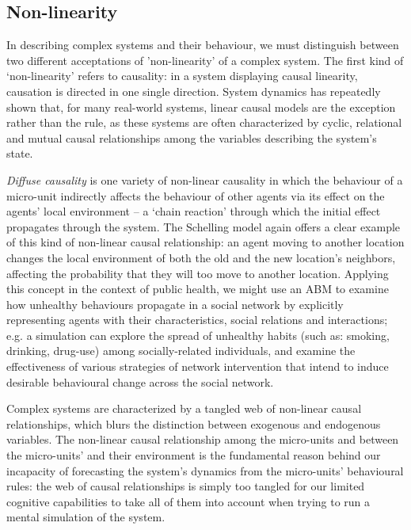 \documentclass[review]{elsarticle}
\begin{document}
\subsection{Non-linearity}
In describing complex systems and their behaviour, we must distinguish between two different acceptations of 'non-linearity' of a complex system. The first kind of `non-linearity' refers to causality: in a system displaying causal linearity, causation is directed in one single direction. System dynamics has repeatedly shown that, for many real-world systems, linear causal models are the exception rather than the rule, as these systems are often characterized by cyclic, relational and mutual causal relationships among the variables describing the system's state. 

\textit{Diffuse causality} is one variety of non-linear causality in which the behaviour of a micro-unit indirectly affects the behaviour of other agents via its effect on the agents' local environment -- a `chain reaction' through which the initial effect propagates through the system. The Schelling model again offers a clear example of this kind of non-linear causal relationship: an agent moving to another location changes the local environment of both the old and the new location's neighbors, affecting the probability that they will too move to another location. Applying this concept in the context of public health, we might use an ABM to examine how unhealthy behaviours propagate in a social network by explicitly representing agents with their characteristics, social relations and interactions; e.g. a simulation can explore the spread of unhealthy habits (such as: smoking, drinking, drug-use) among socially-related individuals, and examine the effectiveness of various strategies of network intervention that intend to induce desirable behavioural change across the social network.

Complex systems are characterized by a tangled web of non-linear causal relationships, which blurs the distinction between exogenous and endogenous variables. The non-linear causal relationship among the micro-units and between the micro-units' and their environment is the fundamental reason behind our incapacity of forecasting the system's dynamics from the micro-units' behavioural rules: the web of causal relationships is simply too tangled for our limited cognitive capabilities to take all of them into account when trying to run a mental simulation of the system. 
\end{document}
